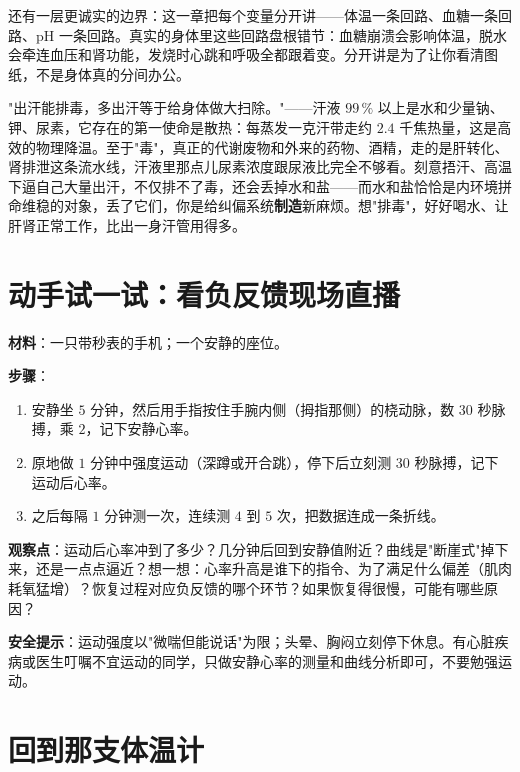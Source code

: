 还有一层更诚实的边界：这一章把每个变量分开讲——体温一条回路、血糖一条回路、pH 一条回路。真实的身体里这些回路盘根错节：血糖崩溃会影响体温，脱水会牵连血压和肾功能，发烧时心跳和呼吸全都跟着变。分开讲是为了让你看清图纸，不是身体真的分间办公。

\begin{wuqu}
"出汗能排毒，多出汗等于给身体做大扫除。"——汗液 $99\,\%$ 以上是水和少量钠、钾、尿素，它存在的第一使命是散热：每蒸发一克汗带走约 $2.4$ 千焦热量，这是高效的物理降温。至于"毒"，真正的代谢废物和外来的药物、酒精，走的是肝转化、肾排泄这条流水线，汗液里那点儿尿素浓度跟尿液比完全不够看。刻意捂汗、高温下逼自己大量出汗，不仅排不了毒，还会丢掉水和盐——而水和盐恰恰是内环境拼命维稳的对象，丢了它们，你是给纠偏系统\textbf{制造}新麻烦。想"排毒"，好好喝水、让肝肾正常工作，比出一身汗管用得多。
\end{wuqu}

\section{动手试一试：看负反馈现场直播}

\begin{shiyan}
\textbf{材料}：一只带秒表的手机；一个安静的座位。

\textbf{步骤}：
\begin{enumerate}[itemsep=1pt]
\item 安静坐 $5$ 分钟，然后用手指按住手腕内侧（拇指那侧）的桡动脉，数 $30$ 秒脉搏，乘 $2$，记下安静心率。
\item 原地做 $1$ 分钟中强度运动（深蹲或开合跳），停下后立刻测 $30$ 秒脉搏，记下运动后心率。
\item 之后每隔 $1$ 分钟测一次，连续测 $4$ 到 $5$ 次，把数据连成一条折线。
\end{enumerate}

\textbf{观察点}：运动后心率冲到了多少？几分钟后回到安静值附近？曲线是"断崖式"掉下来，还是一点点逼近？想一想：心率升高是谁下的指令、为了满足什么偏差（肌肉耗氧猛增）？恢复过程对应负反馈的哪个环节？如果恢复得很慢，可能有哪些原因？

\textbf{安全提示}：运动强度以"微喘但能说话"为限；头晕、胸闷立刻停下休息。有心脏疾病或医生叮嘱不宜运动的同学，只做安静心率的测量和曲线分析即可，不要勉强运动。
\end{shiyan}

\section{回到那支体温计}

